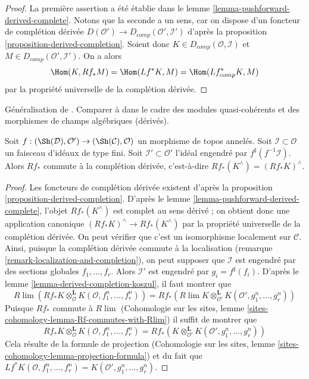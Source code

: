 \begin{proof}
La première assertion a été établie dans le
lemme \ref{lemma-pushforward-derived-complete}.
Notons que la seconde a un sens, car on dispose d'un foncteur de complétion
dérivée $D(\mathcal{O}') \to D_{comp}(\mathcal{O}', \mathcal{I}')$
d'après la proposition \ref{proposition-derived-completion}.
Soient donc $K \in D_{comp}(\mathcal{O}, \mathcal{I})$
et $M \in D_{comp}(\mathcal{O}', \mathcal{I}')$. On a alors
$$
\Hom(K, Rf_*M) = \Hom(Lf^*K, M) = \Hom(Lf_{comp}^*K, M)
$$
par la propriété universelle de la complétion dérivée.
\end{proof}

\begin{lemma}
\label{lemma-pushforward-commutes-with-derived-completion}
\begin{reference}
Généralisation de \cite[Lemma 6.5.9 (2)]{BS}. Comparer à
\cite[Theorem 6.5]{HL-P} dans le cadre des modules quasi-cohérents
et des morphismes de champs algébriques (dérivés).
\end{reference}
Soit $f : (\Sh(\mathcal{D}), \mathcal{O}') \to (\Sh(\mathcal{C}), \mathcal{O})$
un morphisme de topos annelés. Soit $\mathcal{I} \subset \mathcal{O}$
un faisceau d'idéaux de type fini. Soit $\mathcal{I}' \subset \mathcal{O}'$
l'idéal engendré par $f^\sharp(f^{-1}\mathcal{I})$.
Alors $Rf_*$ commute à la complétion dérivée, c'est-à-dire
$Rf_*(K^\wedge) = (Rf_*K)^\wedge$.
\end{lemma}

\begin{proof}
Les foncteurs de complétion dérivée existent d'après la proposition \ref{proposition-derived-completion}.
D'après le lemme \ref{lemma-pushforward-derived-complete}, l'objet
$Rf_*(K^\wedge)$ est complet au sens dérivé ; on obtient donc une application canonique
$(Rf_*K)^\wedge \to Rf_*(K^\wedge)$ par la propriété universelle de la complétion
dérivée. On peut vérifier que c'est un isomorphisme localement sur $\mathcal{C}$.
Ainsi, puisque la complétion dérivée commute à la localisation
(remarque \ref{remark-localization-and-completion}), on peut supposer
que $\mathcal{I}$ est engendré par des sections globales $f_1, \ldots, f_r$.
Alors $\mathcal{I}'$ est engendré par $g_i = f^\sharp(f_i)$. D'après le
lemme \ref{lemma-derived-completion-koszul},
il faut montrer que
$$
R\lim \left(
Rf_*K \otimes^\mathbf{L}_\mathcal{O} K(\mathcal{O}, f_1^n, \ldots, f_r^n)
\right)
=
Rf_*\left(
R\lim
K \otimes^\mathbf{L}_{\mathcal{O}'} K(\mathcal{O}', g_1^n, \ldots, g_r^n)
\right)
$$
Puisque $Rf_*$ commute à $R\lim$
(Cohomologie sur les sites, lemme
\ref{sites-cohomology-lemma-Rf-commutes-with-Rlim})
il suffit de montrer que
$$
Rf_*K \otimes^\mathbf{L}_\mathcal{O} K(\mathcal{O}, f_1^n, \ldots, f_r^n) =
Rf_*\left(
K \otimes^\mathbf{L}_{\mathcal{O}'} K(\mathcal{O}', g_1^n, \ldots, g_r^n)
\right)
$$
Cela résulte de la formule de projection (Cohomologie sur les sites, lemme
\ref{sites-cohomology-lemma-projection-formula}) et du fait que
$Lf^*K(\mathcal{O}, f_1^n, \ldots, f_r^n) =
K(\mathcal{O}', g_1^n, \ldots, g_r^n)$.
\end{proof}

